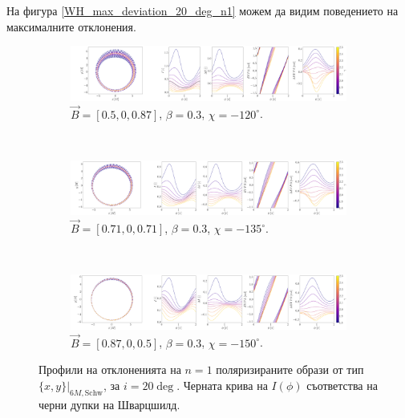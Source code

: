 \newpage

На фигура \ref{WH_max_deviation_20_deg_n1} можем да видим поведението на максималните отклонения.

\begin{figure}[!htb]
	\centering
	\begin{subfigure}{12cm}
		\hspace{-0.5cm}
		\includegraphics[scale = 0.13]{WH_delta_fig_B_0.5_0.87_0_20_deg_r6_n1.png}
		\caption{$\vec{B} = [0.5, 0, 0.87]$, $\beta = 0.3$, $\chi = -120^\circ$.} 
	\end{subfigure}\\
	\begin{subfigure}{12cm}
		\hspace{-0.5cm}
		\includegraphics[scale = 0.13]{WH_delta_fig_B_0.71_0.71_0_20_deg_r6_n1.png}
		\caption{$\vec{B} = [0.71, 0, 0.71]$, $\beta = 0.3$, $\chi = -135^\circ$.}
	\end{subfigure}\\
	\begin{subfigure}{12cm}
		\hspace{-0.5cm}
		\includegraphics[scale = 0.13]{WH_delta_fig_B_0.87_0.5_0_20_deg_r6_n1.png}
		\caption{$\vec{B} = [0.87, 0, 0.5]$, $\beta = 0.3$, $\chi = -150^\circ$.}
	\end{subfigure}
	\caption[Профили на отклоненията на $n=1$ поляризираните образи oт тип $\{x,y\}\vert_{6M, \text{Schw}}$, за $i = 20\deg$.]{\small Профили на отклоненията на $n=1$ поляризираните образи от тип $\{x,y\}\vert_{6M, \text{Schw}}$, за $i = 20\deg$. Черната крива на $I(\phi)$ съответства на черни дупки на Шварцшилд.} 
	\label{WH_delta_r6_20_deg_n1}
\end{figure}

